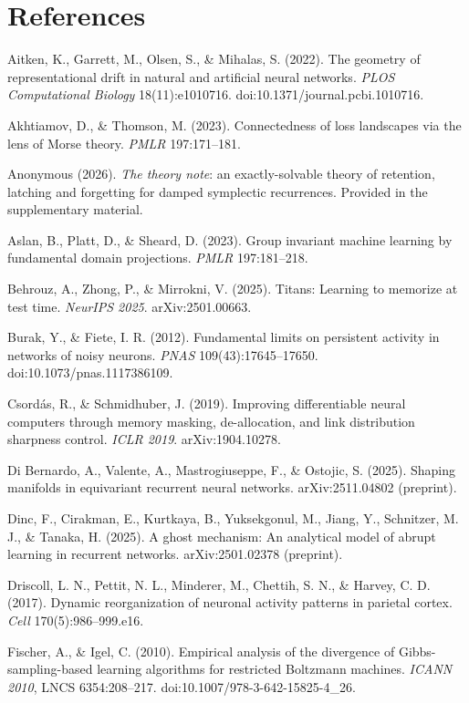 \documentclass{article}
\begin{document}
\section*{References}
{\footnotesize
\begingroup
\setlength{\parindent}{-0.22in}\setlength{\leftskip}{0.22in}\setlength{\parskip}{2pt}

Aitken, K., Garrett, M., Olsen, S., \& Mihalas, S. (2022). The geometry of representational drift in natural and artificial neural networks. \emph{PLOS Computational Biology} 18(11):e1010716. doi:10.1371/journal.pcbi.1010716.\par
Akhtiamov, D., \& Thomson, M. (2023). Connectedness of loss landscapes via the lens of Morse theory. \emph{PMLR} 197:171--181.\par
Anonymous (2026). \emph{The theory note}: an exactly-solvable theory of retention, latching and forgetting for damped symplectic recurrences. Provided in the supplementary material.\par
Aslan, B., Platt, D., \& Sheard, D. (2023). Group invariant machine learning by fundamental domain projections. \emph{PMLR} 197:181--218.\par
Behrouz, A., Zhong, P., \& Mirrokni, V. (2025). Titans: Learning to memorize at test time. \emph{NeurIPS 2025}. arXiv:2501.00663.\par
Burak, Y., \& Fiete, I. R. (2012). Fundamental limits on persistent activity in networks of noisy neurons. \emph{PNAS} 109(43):17645--17650. doi:10.1073/pnas.1117386109.\par
Csord\'as, R., \& Schmidhuber, J. (2019). Improving differentiable neural computers through memory masking, de-allocation, and link distribution sharpness control. \emph{ICLR 2019}. arXiv:1904.10278.\par
Di Bernardo, A., Valente, A., Mastrogiuseppe, F., \& Ostojic, S. (2025). Shaping manifolds in equivariant recurrent neural networks. arXiv:2511.04802 (preprint).\par
Dinc, F., Cirakman, E., Kurtkaya, B., Yuksekgonul, M., Jiang, Y., Schnitzer, M. J., \& Tanaka, H. (2025). A ghost mechanism: An analytical model of abrupt learning in recurrent networks. arXiv:2501.02378 (preprint).\par
Driscoll, L. N., Pettit, N. L., Minderer, M., Chettih, S. N., \& Harvey, C. D. (2017). Dynamic reorganization of neuronal activity patterns in parietal cortex. \emph{Cell} 170(5):986--999.e16.\par
Fischer, A., \& Igel, C. (2010). Empirical analysis of the divergence of Gibbs-sampling-based learning algorithms for restricted Boltzmann machines. \emph{ICANN 2010}, LNCS 6354:208--217. doi:10.1007/978-3-642-15825-4\_26.\par
}
\end{document}
